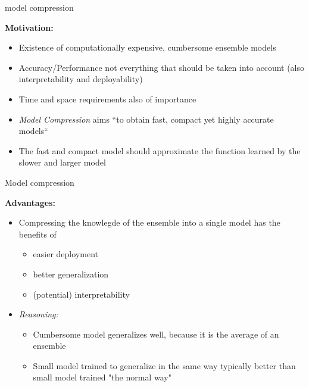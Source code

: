 \documentclass[11pt,compress,t,notes=noshow, xcolor=table]{beamer}
\begin{document}


\begin{frame}{model compression}

\vfill

\textbf{Motivation:} 

\begin{itemize}
				\item Existence of computationally expensive, cumbersome ensemble models
				\item Accuracy/Performance not everything that should be taken into account (also interpretability and deployability)
				\item Time and space requirements also of importance
				\item \textit{Model Compression} aims ``to obtain fast, compact yet highly accurate models``
				\item The fast and compact model should approximate the function learned by the slower and larger model
\end{itemize}

\vfill

\end{frame}


\begin{frame}{Model compression}

\vfill

\textbf{Advantages:}

\begin{itemize}
	\item Compressing the knowlegde of the ensemble into a single model has the benefits of
			\begin{itemize}
				\item easier deployment
				\item better generalization
				\item (potential) interpretability
			\end{itemize} 
	\item \textit{Reasoning:}
		\begin{itemize}
			\item Cumbersome model generalizes well, because it is the average of an ensemble
			\item Small model trained to generalize in the same way typically better than small model trained "the normal way"
		\end{itemize}
\end{itemize}

\vfill

\end{frame}
\end{document}
